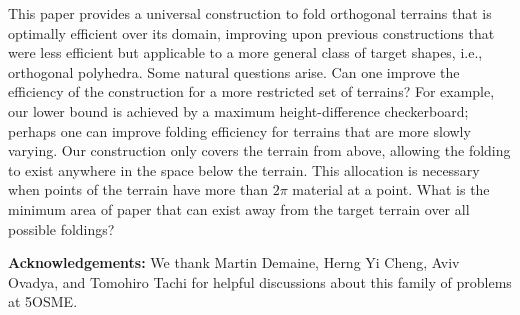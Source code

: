 \documentclass[10pt,twoside]{article}
\begin{document}
\maketitle










This paper provides a universal construction to fold orthogonal terrains that is
optimally efficient over its domain, improving upon previous constructions that
were less efficient but applicable to a more general class of target shapes,
i.e., orthogonal polyhedra. Some natural questions arise. Can one improve the
efficiency of the construction for a more restricted set of terrains? For
example, our lower bound is achieved by a maximum height-difference
checkerboard; perhaps one can improve folding efficiency for terrains that are
more slowly varying. Our construction only covers the terrain from above,
allowing the folding to exist anywhere in the space below the terrain. This
allocation is necessary when points of the terrain have more than $2\pi$
material at a point. What is the minimum area of paper that can exist away from
the target terrain over all possible foldings? 

{\bf Acknowledgements:} We thank Martin Demaine, Herng Yi Cheng, Aviv Ovadya,
and Tomohiro Tachi for helpful discussions about this family of problems
at 5OSME.

{\small


}

\theaffiliations
\end{document}
